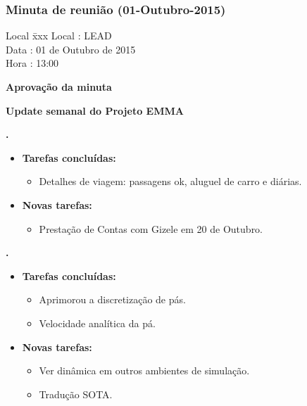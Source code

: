 \subsubsection{Minuta de reunião (01-Outubro-2015)}

\begin{tabbing}
  Local \= xxx \kill
  Local \> : LEAD \\
  Data  \> : 01 de Outubro de 2015 \\
  Hora  \> : 13:00
\end{tabbing}


\textbf{Aprovação da minuta}

\textbf{Update semanal do Projeto EMMA}
   							
\textbf{\alana.} 
	\begin{itemize}
		\item \textbf{Tarefas concluídas:}
			\begin{itemize}    
				\item Detalhes de viagem: passagens ok, aluguel de carro e diárias.

			 
			\end{itemize}
		
		\item \textbf{Novas tarefas:}
			\begin{itemize} 
				\item Prestação de Contas com Gizele em 20 de Outubro.
			\end{itemize}
	\end{itemize}   		

	  \textbf{\renan.} 
	\begin{itemize}
		\item \textbf{Tarefas concluídas:}
			\begin{itemize}    
				\item Aprimorou a discretização de pás.
				\item Velocidade analítica da pá.
			\end{itemize}
		
		\item \textbf{Novas tarefas:}
			\begin{itemize} 
			    \item Ver dinâmica em outros ambientes de simulação.
			    \item Tradução SOTA.
			\end{itemize}
	\end{itemize}	
	
